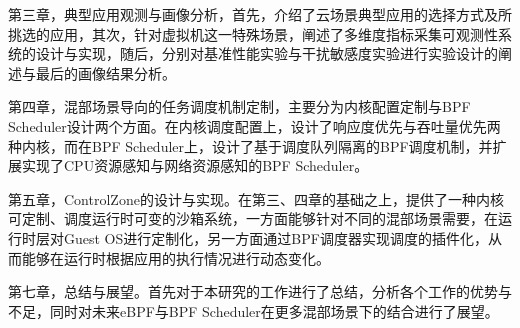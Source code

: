 第三章，典型应用观测与画像分析，首先，介绍了云场景典型应用的选择方式及所挑选的应用，其次，针对虚拟机这一特殊场景，阐述了多维度指标采集可观测性系统的设计与实现，随后，分别对基准性能实验与干扰敏感度实验进行实验设计的阐述与最后的画像结果分析。

第四章，混部场景导向的任务调度机制定制，主要分为内核配置定制与BPF Scheduler设计两个方面。在内核调度配置上，设计了响应度优先与吞吐量优先两种内核，而在BPF Scheduler上，设计了基于调度队列隔离的BPF调度机制，并扩展实现了CPU资源感知与网络资源感知的BPF Scheduler。

第五章，ControlZone的设计与实现。在第三、四章的基础之上，提供了一种内核可定制、调度运行时可变的沙箱系统，一方面能够针对不同的混部场景需要，在运行时层对Guest OS进行定制化，另一方面通过BPF调度器实现调度的插件化，从而能够在运行时根据应用的执行情况进行动态变化。

第七章，总结与展望。首先对于本研究的工作进行了总结，分析各个工作的优势与不足，同时对未来eBPF与BPF Scheduler在更多混部场景下的结合进行了展望。